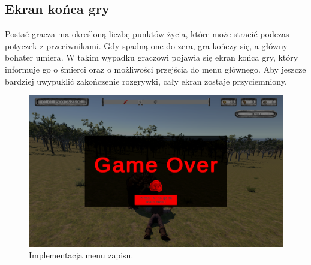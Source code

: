 \subsection{Ekran końca gry}
Postać gracza ma określoną liczbę punktów życia, które może stracić podczas potyczek z przeciwnikami. Gdy spadną one do zera, gra kończy się, a główny bohater umiera.
W takim wypadku graczowi pojawia się ekran końca gry, który informuje go o śmierci oraz o możliwości przejścia do menu głównego. Aby jeszcze bardziej uwypuklić zakończenie 
rozgrywki, cały ekran zostaje przyciemniony.
\begin{figure}[htbp]
    \centering
    \includegraphics[width=1.0\textwidth]{images/ui/endgame_screen.png}
    \caption{Implementacja menu zapisu.}\label{fig:end_sc}
\end{figure}
\FloatBarrier
